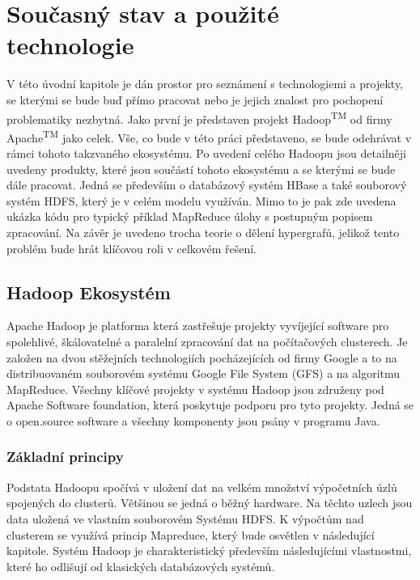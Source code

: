 \documentclass[thesis=M,czech]{FITthesis}[2012/06/26]
\begin{document}
\chapter{Současný stav a použité technologie}
V této úvodní kapitole je dán prostor pro seznámení s technologiemi a projekty, se kterými se bude buď přímo pracovat nebo je jejich znalost pro pochopení problematiky nezbytná. Jako první je představen projekt Hadoop\textsuperscript{TM} od firmy Apache\textsuperscript{TM} jako celek. Vše, co bude v této práci představeno, se bude odehrávat v rámci tohoto takzvaného ekosystému. Po uvedení celého Hadoopu jsou detailněji uvedeny produkty, které jsou součástí tohoto ekosystému a se kterými se bude dále pracovat. Jedná se především o databázový systém HBase a také souborový systém HDFS, který je v celém modelu využíván. Mimo to je pak zde uvedena ukázka kódu pro typický příklad MapReduce úlohy s postupným popisem zpracování. Na závěr je uvedeno trocha teorie o dělení hypergrafů, jelikož tento problém bude hrát klíčovou roli v celkovém řešení.


\section{Hadoop Ekosystém}
Apache Hadoop je platforma která zastřešuje projekty vyvíjející software pro spolehlivé, škálovatelné a paralelní zpracování dat na počítačových clusterech. Je založen na dvou stěžejních  technologiích pocházejících od firmy Google  a to na distribuovaném souborovém systému Google File System (GFS)\cite{GFS} a na algoritmu MapReduce\cite{HadoopDum}. Všechny klíčové projekty v systému Hadoop jsou združeny  pod Apache Software foundation, která poskytuje podporu pro tyto projekty. Jedná se o open.source software a všechny komponenty jsou psány v programu Java.

\subsection{Základní principy}
Podstata Hadoopu spočívá v uložení dat na velkém množství výpočetních úzlů spojených do clusterů. Většinou se jedná o běžný hardware. Na těchto uzlech jsou data uložená ve vlastním souborovém Systému HDFS. K výpočtům nad clusterem se využívá princip Mapreduce, který bude osvětlen v následující kapitole. Systém Hadoop je charakteristický především následujícími vlastnostmi, které ho odlišují od klasických databázových systémů.
\end{document}
